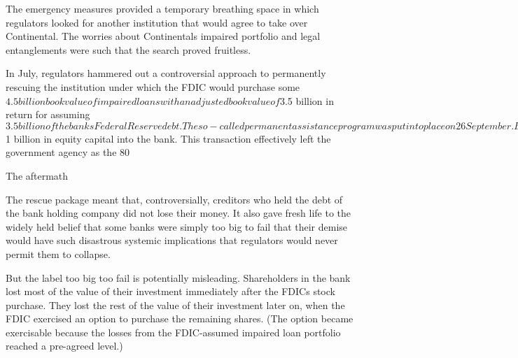 The emergency measures provided a temporary breathing space in which regulators looked for another institution that would agree to take over Continental. The worries about Continentals impaired portfolio and legal entanglements were such that the search proved fruitless.

In July, regulators hammered out a controversial approach to permanently rescuing the institution under which the FDIC would purchase some $4.5 billion book value of impaired loans with an adjusted book value of $3.5 billion in return for assuming $3.5 billion of the banks Federal Reserve debt.

The so-called permanent assistance program was put into place on 26 September. But the impaired loan portfolio, composed largely of energy and international shipping loans, was so large and complex that the FDIC had to ask Continental itself to manage the loans through a special unit (under strict FDIC oversight).

Under the permanent assistance program, the FDIC also acquired preferred stock in Continentals holding company, in return for infusing $1 billion in equity capital into the bank. This transaction effectively left the government agency as the 80%






 












The aftermath

The rescue package meant that, controversially, creditors who held the debt of the bank holding company did not lose their money. It also gave fresh life to the widely held belief that some banks were simply too big to fail that their demise would have such disastrous systemic implications that regulators would never permit them to collapse.

But the label too big too fail is potentially misleading. Shareholders in the bank lost most of the value of their investment immediately after the FDICs stock purchase. They lost the rest of the value of their investment later on, when the FDIC exercised an option to purchase the remaining shares. (The option became exercisable because the losses from the FDIC-assumed impaired loan portfolio reached a pre-agreed level.)

